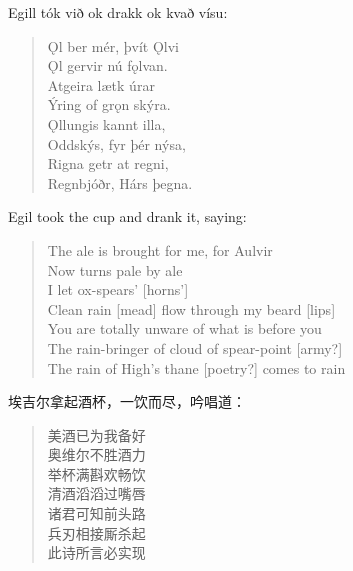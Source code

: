 \begin{paracol}{2}
    Egill tók við ok drakk ok kvað vísu:
    \begin{quote}
        Ǫl ber mér, þvít Ǫlvi\\
        Ǫl gervir nú fǫlvan.\\
        Atgeira lætk úrar\\
        Ýring of grǫn skýra.\\
        Ǫllungis kannt illa,\\
        Oddskýs, fyr þér nýsa,\\
        Rigna getr at regni,\\
        Regnbjóðr, Hárs þegna.
    \end{quote}

    \switchcolumn
    Egil took the cup and drank it, saying:
    \begin{quote}
        The ale is brought for me, for Aulvir\\
        Now turns pale by ale\\
        I let ox-spears' [horns']\\
        Clean rain [mead] flow through my beard [lips]\\
        You are totally unware of what is before you\\
        The rain-bringer of cloud of spear-point [army?]\\
        The rain of High's thane [poetry?] comes to rain
    \end{quote}
\end{paracol}
\begin{translation*}{}
    埃吉尔拿起酒杯，一饮而尽，吟唱道：
    \begin{quote}
        美酒已为我备好\\
        奥维尔不胜酒力\\
        举杯满斟欢畅饮\\
        清酒滔滔过嘴唇\\
        诸君可知前头路\\
        兵刃相接厮杀起\\
        此诗所言必实现
    \end{quote}

\end{translation*}
